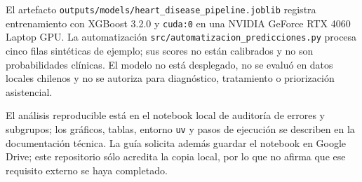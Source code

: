El artefacto \texttt{outputs/models/heart\_disease\_pipeline.joblib} registra entrenamiento con XGBoost 3.2.0 y \texttt{cuda:0} en una NVIDIA GeForce RTX 4060 Laptop GPU. La automatización \texttt{src/automatizacion\_predicciones.py} procesa cinco filas sintéticas de ejemplo; sus scores no están calibrados y no son probabilidades clínicas. El modelo no está desplegado, no se evaluó en datos locales chilenos y no se autoriza para diagnóstico, tratamiento o priorización asistencial.

El análisis reproducible está en el notebook local de auditoría de errores y subgrupos; los gráficos, tablas, entorno \texttt{uv} y pasos de ejecución se describen en la documentación técnica. La guía solicita además guardar el notebook en Google Drive; este repositorio sólo acredita la copia local, por lo que no afirma que ese requisito externo se haya completado.
